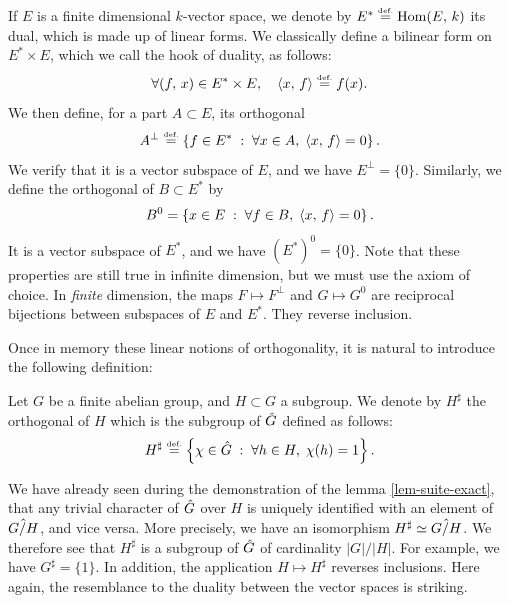  
  \label{notation-34} \label{notation-35} \label{notation-36}  If $ E $ is a finite dimensional $k$-vector space, we denote by $ E^* \stackrel{\mbox{\upshape\tiny def.}}{=} \operatorname{Hom} (E, \, k) $ its dual, which is made up of linear forms. We classically define a bilinear form on $ E^* \times E $, which we call the hook of duality, as follows:
\begin{equation*}
\forall (f, \, x) \in E^* \times E, \quad \langle x,\,f\rangle \stackrel{\mbox{\upshape\tiny def.}}{=} f(x).
\end{equation*}
We then define, for a part $ A \subset E $, its orthogonal
\begin{equation}
\label{eq-defn-orthogonal-ev}
A^{\bot} \stackrel{\mbox{\upshape\tiny def.}}{=} \left\{ f \in E^* \;:\; \forall x \in A, \; \langle x,\,f\rangle = 0 \right\}.
\end{equation}
We verify that it is a vector subspace of $ E $, and we have $ E^{\bot} = \{0\} $. Similarly, we define the orthogonal of $ B \subset E^* $ by
\begin{equation*}
B^{0} = \left\{ x \in E \;:\; \forall f \in B, \; \langle x,\,f\rangle = 0 \right\}.
\end{equation*}
It is a vector subspace of $ E^* $, and we have $ (E^*)^0 = \{0\} $. Note that these properties are still true in infinite dimension, but we must use the axiom of choice. In \textit{finite} dimension, the maps $ F \mapsto F^{\bot} $ and $ G \mapsto G^0 $ are reciprocal bijections between subspaces of $ E $ and $ E^* $. They reverse inclusion.
 
 
Once in memory these linear notions of orthogonality, it is natural to introduce the following definition:
 
\begin{defn}
\label{defn-orthogonal-abelian-subgroup}
  \label{notation-37} Let $ G $ be a finite abelian group, and $ H \subset G $ a subgroup. We denote by $ H^{\sharp} $ the orthogonal of $ H $ which is the subgroup of $ \hat{G} $ defined as follows:
\begin{equation*}
H^{\sharp} \stackrel{\mbox{\upshape\tiny def.}}{=} \left\{ \chi \in \hat{G} \;:\; \forall h \in H, \; \chi (h) = 1 \right\}.
\end{equation*}
\end{defn}

We have already seen during the demonstration of the lemma \ref{lem-suite-exact}, that any trivial character of $ \hat{G} $ over $ H $ is uniquely identified with an element of $ \hat{G / H} $, and vice versa. More precisely, we have an isomorphism $ H^{\sharp} \simeq \hat{G / H} $. We therefore see that $ H^{\sharp} $ is a subgroup of $ \hat{G} $ of cardinality $ |G| / | H | $. For example, we have $ G^{\sharp} = \{1\} $. In addition, the application $ H \mapsto H^{\sharp} $ reverses inclusions. Here again, the resemblance to the duality between the vector spaces is striking.
 
